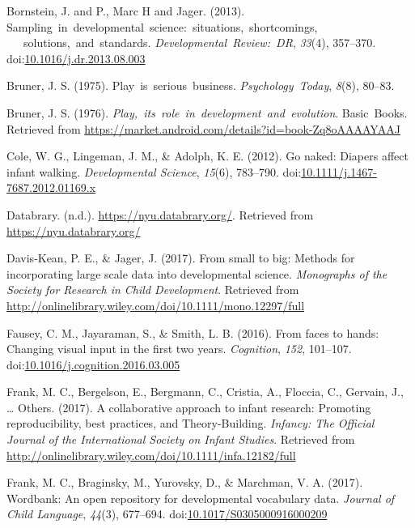 \documentclass[english,man]{apa6}
\theoremstyle{definition}
\theoremstyle{definition}
\theoremstyle{definition}
\theoremstyle{remark}
\begin{document}
\hypertarget{ref-Bornstein2013-mr}{}
Bornstein, J. and P., Marc H and Jager. (2013).
Sampling~in~developmental~science:~situations,~shortcomings,
~~~solutions,~and~standards. \emph{Developmental~Review:~DR},
\emph{33}(4), 357--370.
doi:\href{https://doi.org/10.1016/j.dr.2013.08.003}{10.1016/j.dr.2013.08.003}

\hypertarget{ref-Bruner1975-sp}{}
Bruner, J. S. (1975). Play~is~serious~business. \emph{Psychology~Today},
\emph{8}(8), 80--83.

\hypertarget{ref-Bruner1976-ab}{}
Bruner, J. S. (1976).
\emph{Play,~its~role~in~development~and~evolution}. Basic~Books.
Retrieved from
\url{https://market.android.com/details?id=book-Zq8oAAAAYAAJ}

\hypertarget{ref-Cole2012-vr}{}
Cole, W. G., Lingeman, J. M., \& Adolph, K. E. (2012). Go naked: Diapers
affect infant walking. \emph{Developmental Science}, \emph{15}(6),
783--790.
doi:\href{https://doi.org/10.1111/j.1467-7687.2012.01169.x}{10.1111/j.1467-7687.2012.01169.x}

\hypertarget{ref-databrary-site}{}
Databrary. (n.d.). \url{https://nyu.databrary.org/}. Retrieved from
\url{https://nyu.databrary.org/}

\hypertarget{ref-DavisKean2017-sr}{}
Davis‐Kean, P. E., \& Jager, J. (2017). From small to big: Methods for
incorporating large scale data into developmental science.
\emph{Monographs of the Society for Research in Child Development}.
Retrieved from
\url{http://onlinelibrary.wiley.com/doi/10.1111/mono.12297/full}

\hypertarget{ref-Fausey2016-kx}{}
Fausey, C. M., Jayaraman, S., \& Smith, L. B. (2016). From faces to
hands: Changing visual input in the first two years. \emph{Cognition},
\emph{152}, 101--107.
doi:\href{https://doi.org/10.1016/j.cognition.2016.03.005}{10.1016/j.cognition.2016.03.005}

\hypertarget{ref-Frank2017-tb}{}
Frank, M. C., Bergelson, E., Bergmann, C., Cristia, A., Floccia, C.,
Gervain, J., \ldots{} Others. (2017). A collaborative approach to infant
research: Promoting reproducibility, best practices, and
Theory-Building. \emph{Infancy: The Official Journal of the
International Society on Infant Studies}. Retrieved from
\url{http://onlinelibrary.wiley.com/doi/10.1111/infa.12182/full}

\hypertarget{ref-Frank2017-bt}{}
Frank, M. C., Braginsky, M., Yurovsky, D., \& Marchman, V. A. (2017).
Wordbank: An open repository for developmental vocabulary data.
\emph{Journal of Child Language}, \emph{44}(3), 677--694.
doi:\href{https://doi.org/10.1017/S0305000916000209}{10.1017/S0305000916000209}
\end{document}
